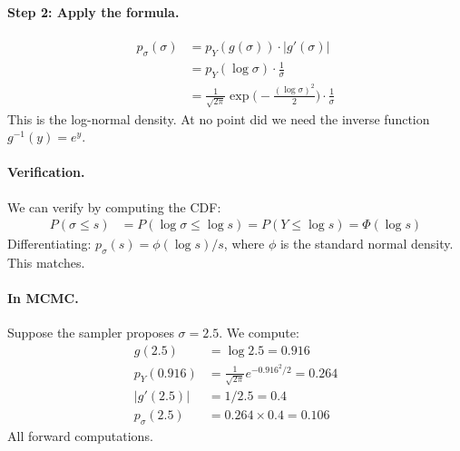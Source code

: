 \documentclass[11pt,a4paper]{article}
\theoremstyle{definition}
\begin{document}
\paragraph{Step 2: Apply the formula.}
\begin{align}
    p_\sigma(\sigma) &= p_Y(g(\sigma)) \cdot |g'(\sigma)| \\
    &= p_Y(\log \sigma) \cdot \frac{1}{\sigma} \\
    &= \frac{1}{\sqrt{2\pi}} \exp\!\Big(-\frac{(\log \sigma)^2}{2}\Big)
    \cdot \frac{1}{\sigma}
\end{align}
This is the log-normal density. At no point did we need the inverse function
$g^{-1}(y) = e^y$.

\paragraph{Verification.} We can verify by computing the CDF:
\begin{align}
    P(\sigma \leq s) &= P(\log \sigma \leq \log s)
    = P(Y \leq \log s) = \Phi(\log s)
\end{align}
Differentiating: $p_\sigma(s) = \phi(\log s) / s$, where $\phi$ is the
standard normal density. This matches.

\paragraph{In MCMC.} Suppose the sampler proposes $\sigma = 2.5$. We compute:
\begin{align}
    g(2.5) &= \log 2.5 = 0.916 \\
    p_Y(0.916) &= \frac{1}{\sqrt{2\pi}} e^{-0.916^2/2} = 0.264 \\
    |g'(2.5)| &= 1/2.5 = 0.4 \\
    p_\sigma(2.5) &= 0.264 \times 0.4 = 0.106
\end{align}
All forward computations.
\end{document}
